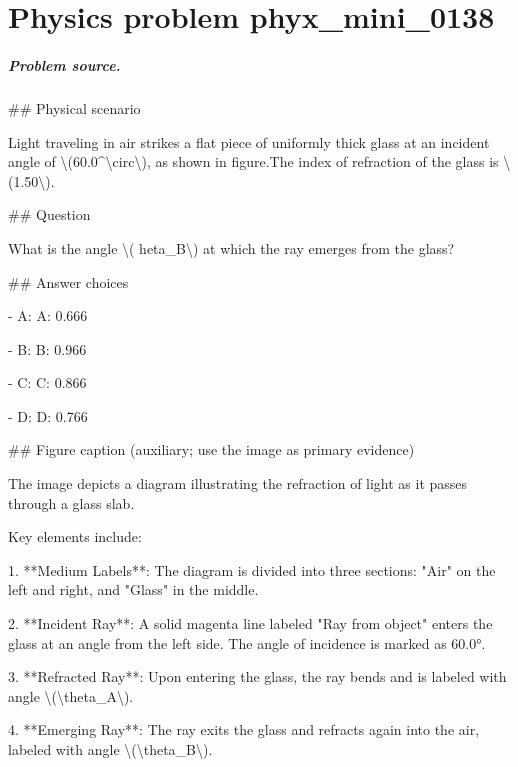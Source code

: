 
\chapter{Physics problem phyx\_mini\_0138}
\label{ch:PhyXMiniProblems_problem_phyx_mini_0138}

\paragraph{Problem source.}
\#\# Physical scenario

Light traveling in air strikes a flat piece of uniformly thick glass at an incident angle of \textbackslash{}(60.0\textasciicircum{}\textbackslash{}circ\textbackslash{}), as shown in figure.The index of refraction of the glass is \textbackslash{}(1.50\textbackslash{}).

\#\# Question

What is the angle \textbackslash{}(	heta\_B\textbackslash{}) at which the ray emerges from the glass?

\#\# Answer choices

- A: A: 0.666

- B: B: 0.966

- C: C: 0.866

- D: D: 0.766

\#\# Figure caption (auxiliary; use the image as primary evidence)

The image depicts a diagram illustrating the refraction of light as it passes through a glass slab. 

Key elements include:

1. **Medium Labels**: The diagram is divided into three sections: "Air" on the left and right, and "Glass" in the middle.

2. **Incident Ray**: A solid magenta line labeled "Ray from object" enters the glass at an angle from the left side. The angle of incidence is marked as 60.0°.

3. **Refracted Ray**: Upon entering the glass, the ray bends and is labeled with angle \textbackslash{}(\textbackslash{}theta\_A\textbackslash{}).

4. **Emerging Ray**: The ray exits the glass and refracts again into the air, labeled with angle \textbackslash{}(\textbackslash{}theta\_B\textbackslash{}).

